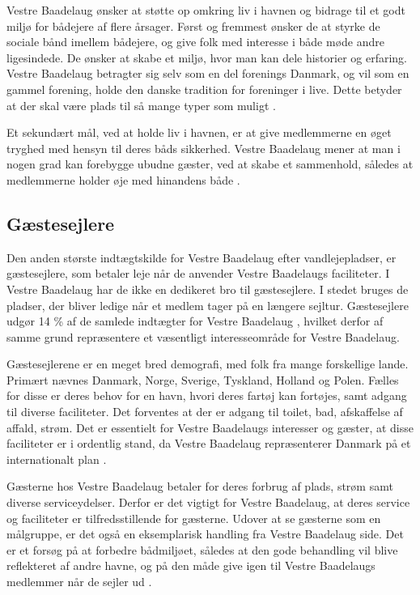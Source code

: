 Vestre Baadelaug ønsker at støtte op omkring liv i havnen og bidrage til et godt miljø for bådejere af flere årsager. Først og fremmest ønsker de at styrke de sociale bånd imellem bådejere, og give folk med interesse i både møde andre ligesindede. De ønsker at skabe et miljø, hvor man kan dele historier og erfaring. Vestre Baadelaug betragter sig selv som en del forenings Danmark, og vil som en gammel forening, holde den danske tradition for foreninger i live. Dette betyder at der skal være plads til så mange typer som muligt \cite{int_vb_sl}.

Et sekundært mål, ved at holde liv i havnen, er at give medlemmerne en øget tryghed med hensyn til deres båds sikkerhed. Vestre Baadelaug mener at man i nogen grad kan forebygge ubudne gæster, ved at skabe et sammenhold, således at medlemmerne holder øje med hinandens både \cite{int_vb_sl}.


\subsection{Gæstesejlere}\label{sec:gaste}

Den anden største indtægtskilde for Vestre Baadelaug efter vandlejepladser, er gæstesejlere, som betaler leje når de anvender Vestre Baadelaugs faciliteter. I Vestre Baadelaug har de ikke en dedikeret bro til gæstesejlere. I stedet bruges de pladser, der bliver ledige når et medlem tager på en længere sejltur. Gæstesejlere udgør 14 \% af de samlede indtægter for Vestre Baadelaug \cite{vestre_arsregnskab}, hvilket derfor af samme grund repræsentere et væsentligt interesseområde for Vestre Baadelaug.

Gæstesejlerene er en meget bred demografi, med folk fra mange forskellige lande. Primært nævnes Danmark, Norge, Sverige, Tyskland, Holland og Polen. Fælles for disse er deres behov for en havn, hvori deres fartøj kan fortøjes, samt adgang til diverse faciliteter. Det forventes at der er adgang til toilet, bad, afskaffelse af affald, strøm. Det er essentielt for Vestre Baadelaugs interesser og gæster, at disse faciliteter er i ordentlig stand, da Vestre Baadelaug repræsenterer Danmark på et internationalt plan \cite{int_vb_sl}.

Gæsterne hos Vestre Baadelaug betaler for deres forbrug af plads, strøm samt diverse serviceydelser. Derfor er det vigtigt for Vestre Baadelaug, at deres service og faciliteter er tilfredsstillende for gæsterne. Udover at se gæsterne som en målgruppe, er det også en eksemplarisk handling fra Vestre Baadelaug side. Det er et forsøg på at forbedre bådmiljøet, således at den gode behandling vil blive reflekteret af andre havne, og på den måde give igen til Vestre Baadelaugs medlemmer når de sejler ud \cite{int_vb_sl}.


